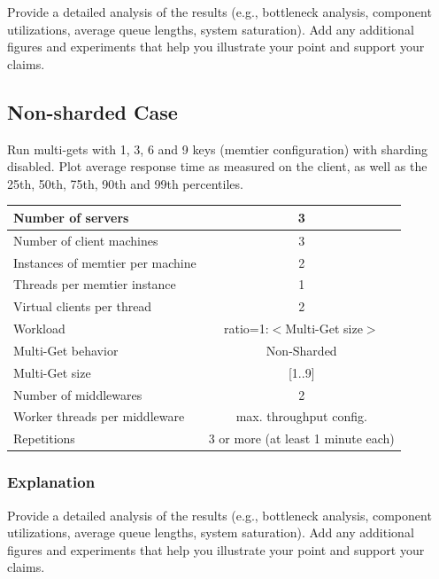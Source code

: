 \documentclass[11pt,a4paper]{article}
\begin{document}
Provide a detailed analysis of the results (e.g., bottleneck analysis, component utilizations, average queue lengths, system saturation). Add any additional figures and experiments that help you illustrate your point and support your claims.

\subsection{Non-sharded Case}

Run multi-gets with 1, 3, 6 and 9 keys (memtier configuration) with sharding disabled. Plot average response time as measured on the client, as well as the 25th, 50th, 75th, 90th and 99th percentiles.

\begin{center}
	\scriptsize{
		\begin{tabular}{|l|c|}
			\hline Number of servers                & 3                       \\ 
			\hline Number of client machines        & 3                       \\ 
			\hline Instances of memtier per machine & 2                       \\ 
			\hline Threads per memtier instance     & 1                       \\
			\hline Virtual clients per thread       & 2                		 \\ 
			\hline Workload                         & ratio=1:$<$Multi-Get size$>$              \\
			\hline Multi-Get behavior               & Non-Sharded             \\
			\hline Multi-Get size                   & [1..9]                  \\
			\hline Number of middlewares            & 2                       \\
			\hline Worker threads per middleware    & max. throughput config. \\
			\hline Repetitions                      & 3 or more (at least 1 minute each)               \\ 
			\hline 
		\end{tabular}
	} 
\end{center}

\subsubsection{Explanation}

Provide a detailed analysis of the results (e.g., bottleneck analysis, component utilizations, average queue lengths, system saturation). Add any additional figures and experiments that help you illustrate your point and support your claims.
\end{document}
